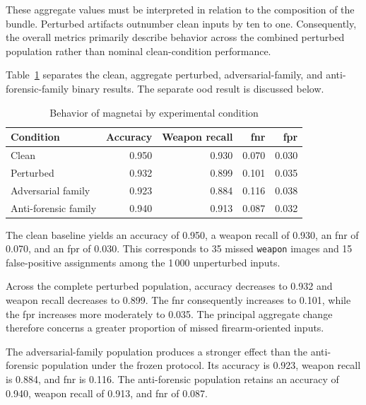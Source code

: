 These aggregate values must be interpreted in relation to the composition of
the bundle. Perturbed artifacts outnumber clean inputs by ten to one.
Consequently, the overall metrics primarily describe behavior across the
combined perturbed population rather than nominal clean-condition performance.

Table~\ref{tab:results-magnet-condition-metrics} separates the clean,
aggregate perturbed, adversarial-family, and anti-forensic-family binary
results. The separate \gls{ood} result is discussed below.

\begin{table}[H]
\centering
\caption{Behavior of \gls{magnetai} by experimental condition}
\label{tab:results-magnet-condition-metrics}
\small
\renewcommand{\arraystretch}{1.15}
\begin{tabular}{@{}lrrrr@{}}
\toprule
\textbf{Condition} &
\textbf{Accuracy} &
\textbf{Weapon recall} &
\textbf{\gls{fnr}} &
\textbf{\gls{fpr}} \\
\midrule

Clean
&
0.950
&
0.930
&
0.070
&
0.030 \\

Perturbed
&
0.932
&
0.899
&
0.101
&
0.035 \\

Adversarial family
&
0.923
&
0.884
&
0.116
&
0.038 \\

Anti-forensic family
&
0.940
&
0.913
&
0.087
&
0.032 \\

\bottomrule
\end{tabular}
\end{table}

The clean baseline yields an accuracy of 0.950, a weapon recall of 0.930, an
\gls{fnr} of 0.070, and an \gls{fpr} of 0.030. This corresponds to 35 missed
\texttt{weapon} images and 15 false-positive assignments among the 1\,000
unperturbed inputs.

Across the complete perturbed population, accuracy decreases to 0.932 and
weapon recall decreases to 0.899. The \gls{fnr} consequently increases to
0.101, while the \gls{fpr} increases more moderately to 0.035. The principal
aggregate change therefore concerns a greater proportion of missed
firearm-oriented inputs.

The adversarial-family population produces a stronger effect than the
anti-forensic population under the frozen protocol. Its accuracy is 0.923,
weapon recall is 0.884, and \gls{fnr} is 0.116. The anti-forensic population
retains an accuracy of 0.940, weapon recall of 0.913, and \gls{fnr} of 0.087.

